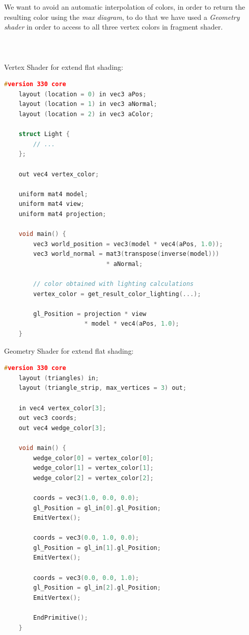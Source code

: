 We want to avoid an automatic interpolation of colors, in order to return the resulting color using the \textit{max diagram}, to do that we have used a \textit{Geometry shader} in order to access to all three vertex colors in fragment shader.
\\
\\
\\
\\
Vertex Shader for extend flat shading:
\begin{lstlisting}[language=C++,
    directivestyle={\color{black}}
    emph={int,char,double,float,unsigned},
    emphstyle={\color{blue}}
   ]
    #version 330 core
    layout (location = 0) in vec3 aPos;
    layout (location = 1) in vec3 aNormal;
    layout (location = 2) in vec3 aColor;

    struct Light {
        // ...
    };

    out vec4 vertex_color;

    uniform mat4 model;
    uniform mat4 view;
    uniform mat4 projection;

    void main() {
        vec3 world_position = vec3(model * vec4(aPos, 1.0));
        vec3 world_normal = mat3(transpose(inverse(model)))
                            * aNormal;

        // color obtained with lighting calculations
        vertex_color = get_result_color_lighting(...);

        gl_Position = projection * view
                      * model * vec4(aPos, 1.0);
    }
\end{lstlisting}

Geometry Shader for extend flat shading:
\begin{lstlisting}[language=C++,
    directivestyle={\color{black}}
    emph={int,char,double,float,unsigned},
    emphstyle={\color{blue}}
   ]
    #version 330 core
    layout (triangles) in;
    layout (triangle_strip, max_vertices = 3) out;

    in vec4 vertex_color[3];
    out vec3 coords;
    out vec4 wedge_color[3];

    void main() {
        wedge_color[0] = vertex_color[0];
        wedge_color[1] = vertex_color[1];
        wedge_color[2] = vertex_color[2];

        coords = vec3(1.0, 0.0, 0.0);
        gl_Position = gl_in[0].gl_Position;
        EmitVertex();

        coords = vec3(0.0, 1.0, 0.0);
        gl_Position = gl_in[1].gl_Position;
        EmitVertex();

        coords = vec3(0.0, 0.0, 1.0);
        gl_Position = gl_in[2].gl_Position;
        EmitVertex();

        EndPrimitive();
    }
\end{lstlisting}

